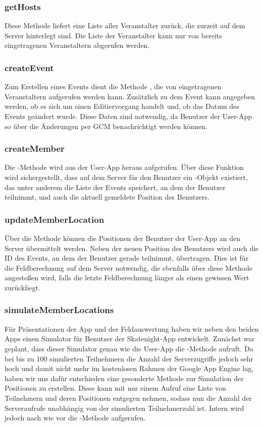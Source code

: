 \subsubsection*{getHosts}
Diese Methode liefert eine Liste aller Veranstalter zurück, die zurzeit auf dem Server hinterlegt sind. Die Liste der Veranstalter kann nur von bereits eingetragenen Veranstaltern abgerufen werden.

\subsubsection*{createEvent}
Zum Erstellen eines Events dient die Methode , die von eingetragenen Veranstaltern aufgerufen werden kann. Zusätzlich zu dem Event kann angegeben werden, ob es sich um einen Editiervorgang handelt und, ob das Datum des Events geändert wurde. Diese Daten sind notwendig, da Benutzer der User-App so über die Änderungen per GCM benachrichtigt werden können.

\subsubsection*{createMember}
Die -Methode wird aus der User-App heraus aufgerufen. Über diese Funktion wird sichergestellt, dass auf dem Server für den Benutzer ein -Objekt existiert, das unter anderem die Liste der Events speichert, an dem der Benutzer teilnimmt, und auch die aktuell gemeldete Position des Benutzers.

\subsubsection*{updateMemberLocation}
Über die Methode  können die Positionen der Benutzer der User-App an den Server übermittelt werden. Neben der neuen Position des Benutzers wird auch die ID des Events, an dem der Benutzer gerade teilnimmt, übertragen. Dies ist für die Feldberechnung auf dem Server notwendig, die ebenfalls über diese Methode angestoßen wird, falls die letzte Feldberechnung länger als einen gewissen Wert zurückliegt.

\subsubsection*{simulateMemberLocations}
Für Präsentationen der App und der Feldauswertung haben wir neben den beiden Apps einen Simulator für Benutzer der Skatenight-App entwickelt. Zunächst war geplant, dass dieser Simulator genau wie die User-App die -Methode aufruft. Da bei bis zu 100 simulierten Teilnehmern die Anzahl der Serverzugriffe jedoch sehr hoch und damit nicht mehr im kostenlosen Rahmen der Google App Engine lag, haben wir uns dafür entschieden eine gesonderte Methode zur Simulation der Positionen zu erstellen. Diese kann mit nur einem Aufruf eine Liste von Teilnehmern und deren Positionen entgegen nehmen, sodass nun die Anzahl der Serveraufrufe unabhängig von der simulierten Teilnehmerzahl ist. Intern wird jedoch nach wie vor die -Methode aufgerufen.

